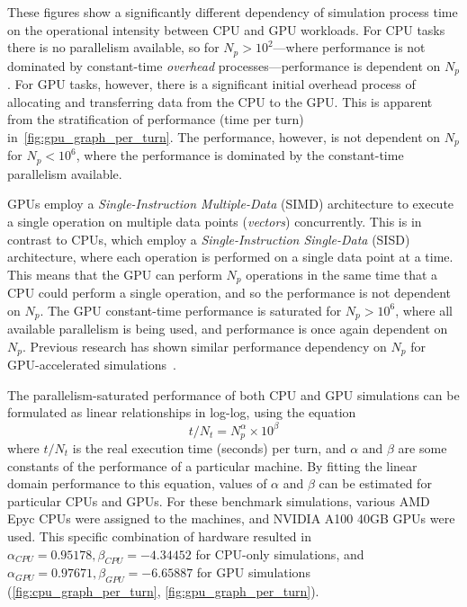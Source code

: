 \documentclass[a4paper,twoside,11pt]{report}
\begin{document}
These figures show a significantly different dependency of simulation process time on the operational intensity between CPU and GPU workloads. For CPU tasks there is no parallelism available, so for $N_p>10^2$---where performance is not dominated by constant-time \textit{overhead} processes---performance is dependent on $N_p$. For GPU tasks, however, there is a significant initial overhead process of allocating and transferring data from the CPU to the GPU. This is apparent from the stratification of performance (time per turn) in~\autoref{fig:gpu_graph_per_turn}. The performance, however, is not dependent on $N_p$ for $N_p<10^6$, where the performance is dominated by the constant-time parallelism available.

GPUs employ a \textit{Single-Instruction Multiple-Data} (SIMD) architecture to execute a single operation on multiple data points (\textit{vectors}) concurrently. This is in contrast to CPUs, which employ a \textit{Single-Instruction Single-Data} (SISD) architecture, where each operation is performed on a single data point at a time. This means that the GPU can perform $N_p$ operations in the same time that a CPU could perform a single operation, and so the performance is not dependent on $N_p$. The GPU constant-time performance is saturated for $N_p>10^6$, where all available parallelism is being used, and performance is once again dependent on $N_p$. Previous research has shown similar performance dependency on $N_p$ for GPU-accelerated simulations~\cite{Hegglin:2239398}.

The parallelism-saturated performance of both CPU and GPU simulations can be formulated as linear relationships in log-log, using the equation
\begin{equation}
  t/N_t = N_p^\alpha \times 10^\beta
\end{equation} where $t/N_t$ is the real execution time (seconds) per turn, and $\alpha$ and $\beta$ are some constants of the performance of a particular machine. By fitting the linear domain performance to this equation, values of $\alpha$ and $\beta$ can be estimated for particular CPUs and GPUs. For these benchmark simulations, various AMD Epyc CPUs were assigned to the machines, and NVIDIA A100 40GB GPUs were used. This specific combination of hardware resulted in $\alpha_{CPU} = 0.95178, \beta_{CPU}=-4.34452$ for CPU-only simulations, and $\alpha_{GPU}=0.97671, \beta_{GPU}=-6.65887$ for GPU simulations (\autoref{fig:cpu_graph_per_turn}, \autoref{fig:gpu_graph_per_turn}).
\end{document}
